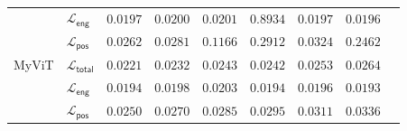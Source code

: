 \documentclass[a4paper,12pt]{extarticle}
\begin{document}
\begin{table}[ht]
\begin{tabular}{llrrrrrrr}
        {} & $\mathcal{L}_{\mathsf{eng}}$ & $\mathsf{0.0197}$ & $\mathsf{0.0200}$ & $\mathsf{0.0201}$ & $\mathsf{0.8934}$ & $\mathsf{0.0197}$ & $\mathsf{0.0196}$ \\
        {} & $\mathcal{L}_{\mathsf{pos}}$ & $\mathsf{0.0262}$ & $\mathsf{0.0281}$ & $\mathsf{0.1166}$ & $\mathsf{0.2912}$ & $\mathsf{0.0324}$ & $\mathsf{0.2462}$ \\
        \midrule
        \textsf{MyViT} & $\mathcal{L}_{\mathsf{total}}$ & $\mathsf{0.0221}$ & $\mathsf{0.0232}$ & $\mathsf{0.0243}$ & $\mathsf{0.0242}$ & $\mathsf{0.0253}$ & $\mathsf{0.0264}$ \\
        {} & $\mathcal{L}_{\mathsf{eng}}$ & $\mathsf{0.0194}$ & $\mathsf{0.0198}$ & $\mathsf{0.0203}$ & $\mathsf{0.0194}$ & $\mathsf{0.0196}$ & $\mathsf{0.0193}$ \\
        {} & $\mathcal{L}_{\mathsf{pos}}$ & $\mathsf{0.0250}$ & $\mathsf{0.0270}$ & $\mathsf{0.0285}$ & $\mathsf{0.0295}$ & $\mathsf{0.0311}$ & $\mathsf{0.0336}$ \\
		\bottomrule
	\end{tabular}
    \caption{}
	\label{table:all_models}
\end{table}
\end{document}
